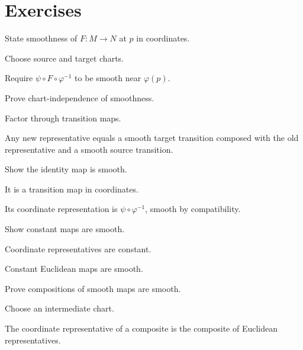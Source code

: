 \section{Exercises}
\begin{exercise}\label{exr:vii03-01}
State smoothness of \(F:M\to N\) at \(p\) in coordinates.
\end{exercise}
\begin{hint}
Choose source and target charts.
\end{hint}
\begin{solution}
Require \(\psi\circ F\circ\varphi^{-1}\) to be smooth near \(\varphi(p)\).
\end{solution}

\begin{exercise}\label{exr:vii03-02}
Prove chart-independence of smoothness.
\end{exercise}
\begin{hint}
Factor through transition maps.
\end{hint}
\begin{solution}
Any new representative equals a smooth target transition composed with the old representative and a smooth source transition.
\end{solution}

\begin{exercise}\label{exr:vii03-03}
Show the identity map is smooth.
\end{exercise}
\begin{hint}
It is a transition map in coordinates.
\end{hint}
\begin{solution}
Its coordinate representation is \(\psi\circ\varphi^{-1}\), smooth by compatibility.
\end{solution}

\begin{exercise}\label{exr:vii03-04}
Show constant maps are smooth.
\end{exercise}
\begin{hint}
Coordinate representatives are constant.
\end{hint}
\begin{solution}
Constant Euclidean maps are smooth.
\end{solution}

\begin{exercise}\label{exr:vii03-05}
Prove compositions of smooth maps are smooth.
\end{exercise}
\begin{hint}
Choose an intermediate chart.
\end{hint}
\begin{solution}
The coordinate representative of a composite is the composite of Euclidean representatives.
\end{solution}

